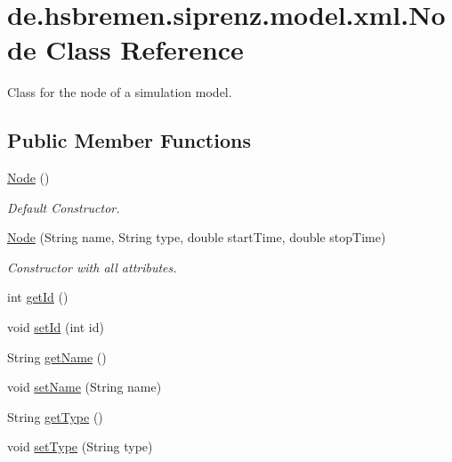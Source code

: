 \hypertarget{classde_1_1hsbremen_1_1siprenz_1_1model_1_1xml_1_1Node}{}\section{de.\+hsbremen.\+siprenz.\+model.\+xml.\+Node Class Reference}
\label{classde_1_1hsbremen_1_1siprenz_1_1model_1_1xml_1_1Node}


Class for the node of a simulation model.  


\subsection*{Public Member Functions}
\begin{DoxyCompactItemize}
\item 
\hyperlink{classde_1_1hsbremen_1_1siprenz_1_1model_1_1xml_1_1Node_afd18b6ab885928758b4e50b016b168ae}{Node} ()
\begin{DoxyCompactList}\small\item\em Default Constructor. \end{DoxyCompactList}\item 
\hyperlink{classde_1_1hsbremen_1_1siprenz_1_1model_1_1xml_1_1Node_a23c2a8d75b9357f3f1cd865e299ffbbd}{Node} (String name, String type, double start\+Time, double stop\+Time)
\begin{DoxyCompactList}\small\item\em Constructor with all attributes. \end{DoxyCompactList}\item 
int \hyperlink{classde_1_1hsbremen_1_1siprenz_1_1model_1_1xml_1_1Node_acccc7efabde23ae977784ef196d1f6c2}{get\+Id} ()
\item 
void \hyperlink{classde_1_1hsbremen_1_1siprenz_1_1model_1_1xml_1_1Node_ad3d2899f02b59b008723bde93f2d9681}{set\+Id} (int id)
\item 
String \hyperlink{classde_1_1hsbremen_1_1siprenz_1_1model_1_1xml_1_1Node_a5e781d99a4440dc81952a92f17c9afe5}{get\+Name} ()
\item 
void \hyperlink{classde_1_1hsbremen_1_1siprenz_1_1model_1_1xml_1_1Node_a4ab4532a13391c45881a1233715e9f8c}{set\+Name} (String name)
\item 
String \hyperlink{classde_1_1hsbremen_1_1siprenz_1_1model_1_1xml_1_1Node_a52d5c57faac6f540bac4d01e2af77c53}{get\+Type} ()
\item 
void \hyperlink{classde_1_1hsbremen_1_1siprenz_1_1model_1_1xml_1_1Node_a86fbe6a308bf4b393af8392a786799dd}{set\+Type} (String type)

\end{DoxyCompactItemize}

